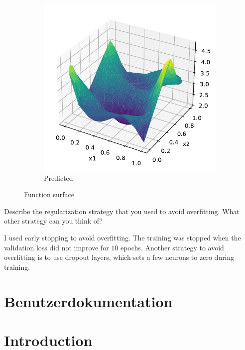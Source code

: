 \documentclass{article}
\newenvironment{task}[1]{
  \begin{tcolorbox}[
    colback=highlight!5!white,
    colframe=highlight,
    title={Task #1}
  ]
}{
  \end{tcolorbox}
}
\begin{document}
\begin{figure}[ht!]
\begin{subfigure}{0.45\textwidth}
    \includegraphics[width=\textwidth]{ex1_regression_predicted.pdf}
    \caption{Predicted}
    \label{fig:ex1_regression_predicted}
  \end{subfigure}
  \caption{Function surface}
  \label{fig:ex1_regression_surface}
\end{figure}


\begin{task}{1.4.4}
  Describe the regularization strategy that you used to avoid overfitting. What other strategy can you
  think of?
\end{task}

I used early stopping to avoid overfitting. The training was stopped when the validation loss did
not improve for $10$ epochs. Another strategy to avoid overfitting is to use dropout layers, which
sets a few neurons to zero during training.




\cite{Ries1522Rad}

\newpage
\nocite{}





\appendix

\section{Benutzerdokumentation}
\label{app1}
\section{Introduction}
\end{document}

